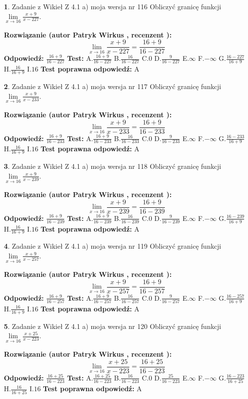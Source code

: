 \documentclass[12pt, a4paper]{article}
\theoremstyle{definition} %
\newtheorem{zad}{}
\newcommand{\zadStart}[1]{\begin{zad}#1\newline}
\newcommand{\zadStop}{\end{zad}}
\newcommand{\rozwStart}[2]{\noindent \textbf{Rozwiązanie (autor #1 , recenzent #2): }\newline}
\newcommand{\rozwStop}{\newline}
\newcommand{\odpStart}{\noindent \textbf{Odpowiedź:}\newline}
\newcommand{\odpStop}{\newline}
\newcommand{\testStart}{\noindent \textbf{Test:}\newline}
\newcommand{\testStop}{\newline}
\newcommand{\kluczStart}{\noindent \textbf{Test poprawna odpowiedź:}\newline}
\newcommand{\kluczStop}{\newline}
\begin{document}
\zadStart{Zadanie z Wikieł Z 4.1 a) moja wersja nr 116}
Obliczyć granicę funkcji $\lim\limits_{x\to16}\frac{x+9}{x-227}$.
\zadStop
\rozwStart{Patryk Wirkus}{}
$$\lim\limits_{x\to16}\frac{x+9}{x-227} = \frac{16+9}{16-227}$$
\rozwStop
\odpStart
$\frac{16+9}{16-227}$
\odpStop
\testStart
A.$\frac{16+9}{16-227}$
B.$\frac{16}{16-227}$
C.$0$
D.$\frac{9}{16-227}$
E.$\infty$
F.$-\infty$
G.$\frac{16-227}{16+9}$
H.$\frac{16}{16+9}$
I.$16$
\testStop
\kluczStart
A
\kluczStop



\zadStart{Zadanie z Wikieł Z 4.1 a) moja wersja nr 117}
Obliczyć granicę funkcji $\lim\limits_{x\to16}\frac{x+9}{x-233}$.
\zadStop
\rozwStart{Patryk Wirkus}{}
$$\lim\limits_{x\to16}\frac{x+9}{x-233} = \frac{16+9}{16-233}$$
\rozwStop
\odpStart
$\frac{16+9}{16-233}$
\odpStop
\testStart
A.$\frac{16+9}{16-233}$
B.$\frac{16}{16-233}$
C.$0$
D.$\frac{9}{16-233}$
E.$\infty$
F.$-\infty$
G.$\frac{16-233}{16+9}$
H.$\frac{16}{16+9}$
I.$16$
\testStop
\kluczStart
A
\kluczStop



\zadStart{Zadanie z Wikieł Z 4.1 a) moja wersja nr 118}
Obliczyć granicę funkcji $\lim\limits_{x\to16}\frac{x+9}{x-239}$.
\zadStop
\rozwStart{Patryk Wirkus}{}
$$\lim\limits_{x\to16}\frac{x+9}{x-239} = \frac{16+9}{16-239}$$
\rozwStop
\odpStart
$\frac{16+9}{16-239}$
\odpStop
\testStart
A.$\frac{16+9}{16-239}$
B.$\frac{16}{16-239}$
C.$0$
D.$\frac{9}{16-239}$
E.$\infty$
F.$-\infty$
G.$\frac{16-239}{16+9}$
H.$\frac{16}{16+9}$
I.$16$
\testStop
\kluczStart
A
\kluczStop



\zadStart{Zadanie z Wikieł Z 4.1 a) moja wersja nr 119}
Obliczyć granicę funkcji $\lim\limits_{x\to16}\frac{x+9}{x-257}$.
\zadStop
\rozwStart{Patryk Wirkus}{}
$$\lim\limits_{x\to16}\frac{x+9}{x-257} = \frac{16+9}{16-257}$$
\rozwStop
\odpStart
$\frac{16+9}{16-257}$
\odpStop
\testStart
A.$\frac{16+9}{16-257}$
B.$\frac{16}{16-257}$
C.$0$
D.$\frac{9}{16-257}$
E.$\infty$
F.$-\infty$
G.$\frac{16-257}{16+9}$
H.$\frac{16}{16+9}$
I.$16$
\testStop
\kluczStart
A
\kluczStop



\zadStart{Zadanie z Wikieł Z 4.1 a) moja wersja nr 120}
Obliczyć granicę funkcji $\lim\limits_{x\to16}\frac{x+25}{x-223}$.
\zadStop
\rozwStart{Patryk Wirkus}{}
$$\lim\limits_{x\to16}\frac{x+25}{x-223} = \frac{16+25}{16-223}$$
\rozwStop
\odpStart
$\frac{16+25}{16-223}$
\odpStop
\testStart
A.$\frac{16+25}{16-223}$
B.$\frac{16}{16-223}$
C.$0$
D.$\frac{25}{16-223}$
E.$\infty$
F.$-\infty$
G.$\frac{16-223}{16+25}$
H.$\frac{16}{16+25}$
I.$16$
\testStop
\kluczStart
A
\kluczStop
\end{document}
